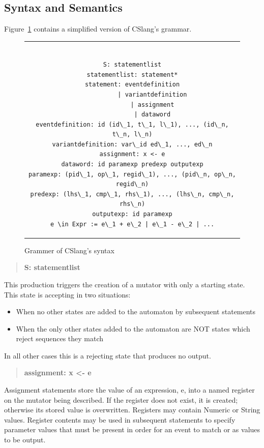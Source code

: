 \subsection{Syntax and Semantics}
\label{sub:SyntaxAndSemantics}

Figure~\ref{lst:SyntaxGrammar} contains a simplified
version of CSlang's grammar.

\begin{figure}[h]
\centering
\begin{tabular}{c}
\begin{lstlisting}

S: statementlist
statementlist: statement*
statement: eventdefinition
           | variantdefinition
           | assignment
           | dataword
eventdefinition: id (id\_1, t\_1, l\_1), ..., (id\_n, t\_n, l\_n)
variantdefinition: var\_id ed\_1, ..., ed\_n
assignment: x <- e
dataword: id paramexp predexp outputexp
paramexp: (pid\_1, op\_1, regid\_1), ..., (pid\_n, op\_n, regid\_n)
predexp: (lhs\_1, cmp\_1, rhs\_1), ..., (lhs\_n, cmp\_n, rhs\_n)
outputexp: id paramexp
e \in Expr := e\_1 + e\_2 | e\_1 - e\_2 | ...
\end{lstlisting}
\end{tabular}
\caption{Grammer of CSlang's syntax}
\label{lst:SyntaxGrammar}
\end{figure}


\begin{quote}
\centering
\textbf{S: statementlist}
\end{quote}

This production triggers the creation of a mutator with only a starting
state.  This state is accepting in two situations:
\begin{itemize}
  \item{When no other states are added to the automaton by subsequent
    statements}
  \item{When the only other states added to the automaton are NOT states
    which reject sequences they match}
\end{itemize}
In all other cases this is a rejecting state that produces no output.

\begin{quote}
\centering
\textbf{assignment: x <- e}
\end{quote}

Assignment statements store the value of an expression, e, into a named
register on the mutator being described.
If the register does not exist,
it is created;
otherwise its stored value is overwritten.
Registers may contain Numeric or String values.  Register contents
may be used in subsequent statements to specify parameter values that must
be present in order for an event to match or as values to be output.


